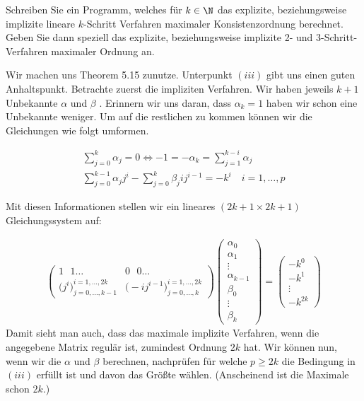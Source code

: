 \begin{exercise}
Schreiben Sie ein Programm, welches für $k \in \N$ das explizite, beziehungsweise
implizite lineare $k$-Schritt Verfahren maximaler Konsistenzordnung berechnet. Geben Sie dann speziell
das explizite, beziehungsweise implizite 2- und 3-Schritt-Verfahren maximaler Ordnung an.
\end{exercise}
\begin{solution}
Wir machen uns Theorem 5.15 zunutze. 
Unterpunkt $(iii)$ gibt uns einen guten Anhaltspunkt. Betrachte zuerst die impliziten Verfahren.
Wir haben jeweils $k+1$ Unbekannte $\alpha$ und $\beta$ . Erinnern wir uns daran,
dass $\alpha_k = 1$ haben wir schon eine Unbekannte weniger. Um auf die restlichen
zu kommen können wir die Gleichungen wie folgt umformen.

\begin{align*}
  \sum_{j=0}^k \alpha_j = 0 \Leftrightarrow -1 = -\alpha_k = \sum_{j=1}^{k-i} \alpha_j \\
  \sum_{j=0}^{k-1}\alpha_j j^i - \sum_{j=0}^k \beta_j ij^{i-1} = -k^i \quad i=1,\dots,p
\end{align*}

Mit diesen Informationen stellen wir ein lineares $(2k+1 \times 2k+1)$ Gleichungssystem auf:

\begin{align*}
  \left(\begin{array}{c|c}
    1 \text{ }1\dots & 0\text{ } 0 \dots \\
    \hline
    \bigg( j^i\bigg)_{j=0,\dots,k-1}^{i=1,\dots,2k} & \bigg( -ij^{i-1}\bigg)_{j=0,\dots,k}^{i=1,\dots,2k}
  \end{array}\right)
  \left(\begin{array}{c}
    \alpha_0 \\
    \alpha_1 \\
    \vdots \\
    \alpha_{k-1} \\
    \beta_0 \\
    \vdots \\
    \beta_k
  \end{array}\right) =
  \left(\begin{array}{c}
    -k^0 \\
    -k^1 \\
    \vdots \\
    -k^{2k}
  \end{array}\right)
\end{align*}
Damit sieht man auch, dass das maximale implizite Verfahren, wenn die angegebene Matrix regulär ist,
zumindest Ordnung $2k$ hat. Wir können nun,
wenn wir die $\alpha$ und $\beta$ berechnen, nachprüfen für welche $p \geq 2k$ die Bedingung
in $(iii)$ erfüllt ist und davon das Größte wählen. (Anscheinend ist die Maximale schon $2k$.)


\end{solution}
